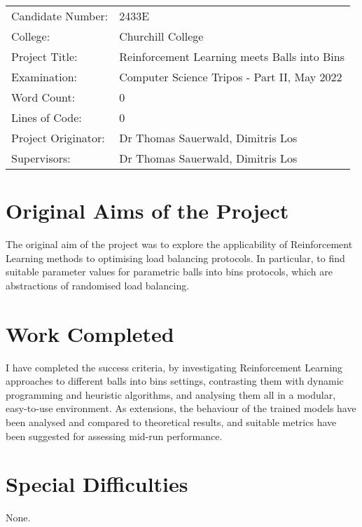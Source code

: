 
\begin{proforma}      


\begin{table}[h]
\begin{tabular}{ll}
Candidate Number:  & 2433E \\
College: & Churchill College \\
Project Title:    &  Reinforcement Learning meets Balls into Bins  \\
Examination:  & Computer Science Tripos - Part II, May 2022   \\
Word Count:  & 0  \\
Lines of Code: & 0 \\
Project Originator: & Dr Thomas Sauerwald, Dimitris Los \\
Supervisors: & Dr Thomas Sauerwald, Dimitris Los 
\end{tabular}
\end{table}

\section*{Original Aims of the Project}

The original aim of the project was to explore the applicability of Reinforcement Learning methods to optimising load balancing protocols. In particular, to find suitable parameter values for parametric balls into bins protocols, which are abstractions of randomised load balancing.

\section*{Work Completed}

I have completed the success criteria, by investigating Reinforcement Learning approaches to different balls into bins settings, contrasting them with dynamic programming and heuristic algorithms, and analysing them all in a modular, easy-to-use environment. As extensions, the behaviour of the trained models have been analysed and compared to theoretical results, and suitable metrics have been suggested for assessing mid-run performance.

\section*{Special Difficulties}

None.

\end{proforma}
